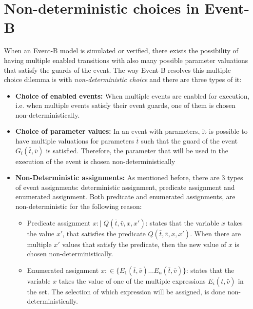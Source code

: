 \section{Non-deterministic choices in Event-B}
When an Event-B model is simulated or verified, there exists the possibility of having multiple enabled transitions with also many possible parameter valuations that satisfy the guards of the event. The way Event-B resolves this multiple choice dilemma is with \textit{non-deterministic choice} and there are three types of it:
\begin{itemize}
    \item \textbf{Choice of enabled events:} When multiple events are enabled for execution, i.e. when multiple events satisfy their event guards, one of them is chosen non-deterministically.  
    \item \textbf{Choice of parameter values:} In an event with parameters, it is possible to have multiple valuations for parameters $\bar{t}$ such that the guard of the event $G_i(\bar{t}, \bar{v})$ is satisfied. Therefore, the parameter that will be used in the execution of the event is chosen non-deterministically
    \item \textbf{Non-Deterministic assignments:} As mentioned before, there are 3 types of event assignments: deterministic assignment, predicate assignment and enumerated assignment. Both predicate and enumerated assignments, are non-deterministic for the following reason:
    \begin{itemize}
        \item Predicate assignment $x :\! | \; Q(\bar{t}, \bar{v}, x, x')$: states that the variable $x$ takes the value $x'$, that satisfies the predicate $Q(\bar{t}, \bar{v}, x, x')$. When there are multiple $x'$ values that satisfy the predicate, then the new value of $x$ is chosen non-deterministically.
        \item Enumerated assignment $x :\in  \{ E_1(\bar{t},\bar{v})... E_n(\bar{t},\bar{v}) \}$: states that the variable $x$ takes the value of one of the multiple expressions $E_i(\bar{t},\bar{v})$ in the set. The selection of which expression will be assigned, is done non-deterministically. 
    \end{itemize}
\end{itemize}

